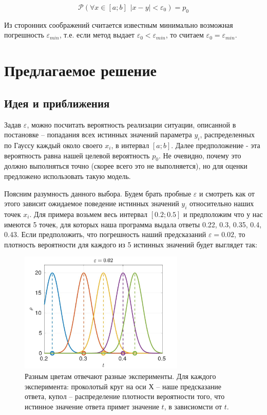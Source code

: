 \documentclass[a4paper,12pt]{article} %
\begin{document}
\begin{equation}
\mathcal{P}(\forall x \in [a;b] \hspace{5pt} |x - y| < \varepsilon_0) = p_0
\end{equation}

Из сторонних соображений считается известным минимально возможная погрешность $\varepsilon_{min}$, т.е. если метод выдает $\varepsilon_0 < \varepsilon_{min}$, то считаем $\varepsilon_0 = \varepsilon_{min}$.

\section{Предлагаемое решение}

\subsection{Идея и приближения}

Задав $\varepsilon$, можно посчитать вероятность реализации ситуации, описанной в постановке -- попадания всех истинных значений параметра $y_i$, распределенных по Гауссу каждый около своего $x_i$, в интервал $[a;b]$. Далее предположение - эта вероятность равна нашей целевой вероятность $p_0$. Не очевидно, почему это должно выполняться точно (скорее всего это не выполняется), но для оценки предложено использовать такую модель. 

Поясним разумность данного выбора. Будем брать пробные $\varepsilon$ и смотреть как от этого зависит ожидаемое поведение истинных значений $y_i$ относительно наших точек $x_i$. Для примера возьмем весь интервал $[0.2; 0.5]$ и предположим что у нас имеются 5 точек, для которых наша программа выдала ответы 0.22, 0.3, 0.35, 0.4, 0.43. Если предположить, что погрешность наший предсказаний $\varepsilon = 0.02$, то плотность вероятности для каждого из 5 истинных значений будет выглядет так:

\begin{figure}[h!]
\begin{center}
\includegraphics[width=0.7\textwidth]{./pics/peaks_med}
\end{center}
\caption{Разным цветам отвечают разные эксперименты. Для каждого эксперимента: проколотый круг на оси Х -- наше предсказание ответа, купол -- распределение плотности вероятности того, что истинное значение ответа примет значение $t$, в зависиомсти от $t$.} \label{img:peaks_med}
\end{figure}
\end{document}
